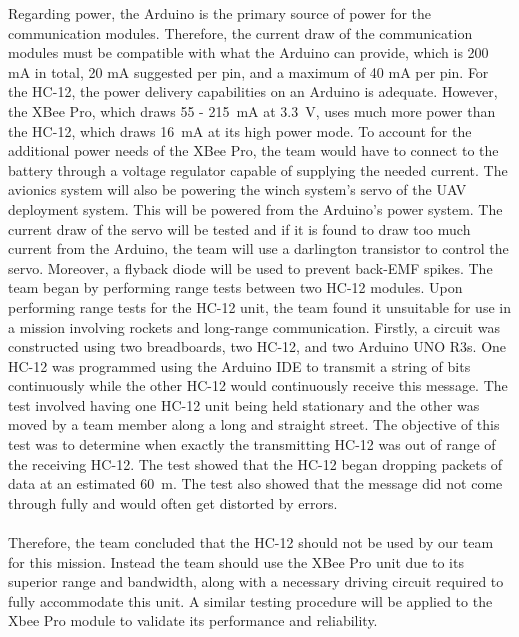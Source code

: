 Regarding power, the Arduino is the primary source of power for the communication modules. Therefore, the current draw of the communication modules must be compatible with what the Arduino can provide, which is 200 mA in total, 20 mA suggested per pin, and a maximum of 40 mA per pin. For the HC-12, the power delivery capabilities on an Arduino is adequate. However, the XBee Pro, which draws 55 - \SI{215}{\milli\ampere} at \SI{3.3}{\volt}, uses much more power than the HC-12, which draws \SI{16}{\milli\ampere} at its high power mode. To account for the additional power needs of the XBee Pro, the team would have to connect to the battery through a voltage regulator capable of supplying the needed current. The avionics system will also be powering the winch system's servo of the UAV deployment system. This will be powered from the Arduino's power system. The current draw of the servo will be tested and if it is found to draw too much current from the Arduino, the team will use a darlington transistor to control the servo. Moreover, a flyback diode will be used to prevent back-EMF spikes. The team began by performing range tests between two HC-12 modules.
Upon performing range tests for the HC-12 unit, the team found it unsuitable for use in a mission involving rockets and long-range communication. Firstly, a circuit was constructed using two breadboards, two HC-12, and two Arduino UNO R3s. One HC-12 was programmed using the Arduino IDE to transmit a string of bits continuously while the other HC-12 would continuously receive this message. The test involved having one HC-12 unit being held stationary and the other was moved by a team member along a long and straight street. The objective of this test was to determine when exactly the transmitting HC-12 was out of range of the receiving HC-12. The test showed that the HC-12 began dropping packets of data at an estimated \SI{60}{\meter}. The test also showed that the message did not come through fully and would often get distorted by errors.
\\\\
Therefore, the team concluded that the HC-12 should not be used by our team for this mission. Instead the team should use the XBee Pro unit due to its superior range and bandwidth, along with a necessary driving circuit required to fully accommodate this unit. A similar testing procedure will be applied to the Xbee Pro module to validate its performance and reliability.
